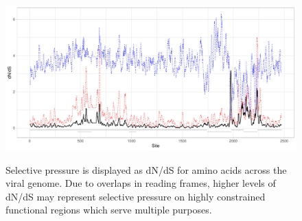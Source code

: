 \documentclass[fleqn,10pt,lineno]{wlpeerj}
\begin{document}
\begin{figure}
\centering
\caption{
Selective pressure is displayed as dN/dS for amino acids across the viral genome. Due to overlaps in reading frames, higher levels of dN/dS may represent selective pressure on highly constrained functional regions which serve multiple purposes.
}
\includegraphics[width=1\textwidth]{supplementaryinfo/selectionplot.pdf}
\label{fig:selectionplot}
\end{figure}
\clearpage

\end{document}
